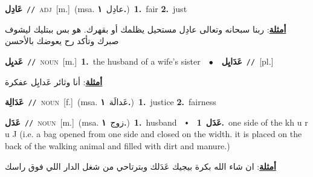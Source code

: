 \documentclass[10pt,a4paper,twoside]{article} %
\begin{document}
\begin{multicols}{2}
{\setlength\topsep{0pt}\textbf{\foreignlanguage{arabic}{عَادِل}}\ {\color{gray}\texttt{//}\color{black}}\ \textsc{adj}\ [m.]\ \color{gray}(msa. \foreignlanguage{arabic}{عادِل}~\foreignlanguage{arabic}{\textbf{١.}})\color{black}\ \textbf{1.}~fair  \textbf{2.}~just\  \begin{flushright}\color{gray}\foreignlanguage{arabic}{\textbf{\underline{\foreignlanguage{arabic}{أمثلة}}}: ربنا سبحانه وتعالى عادِل مستحيل يظلمك أو بقهرك. هو بس ببتليك ليشوف صبرك وتأكد رح يعوضك بالأحسن}\end{flushright}\color{black}} \vspace{2mm}

{\setlength\topsep{0pt}\textbf{\foreignlanguage{arabic}{عَديِل}}\ {\color{gray}\texttt{//}\color{black}}\ \textsc{noun}\ [m.]\ \textbf{1.}~the husband of a wife's sister\ \ $\bullet$\ \ \setlength\topsep{0pt}\textbf{\foreignlanguage{arabic}{عَدَايِل}}\ {\color{gray}\texttt{//}\color{black}}\ [pl.]\  \begin{flushright}\color{gray}\foreignlanguage{arabic}{\textbf{\underline{\foreignlanguage{arabic}{أمثلة}}}: أنا وثائر عَدايِل عفكرة}\end{flushright}\color{black}} \vspace{2mm}

{\setlength\topsep{0pt}\textbf{\foreignlanguage{arabic}{عَدَالِة}}\ {\color{gray}\texttt{//}\color{black}}\ \textsc{noun}\ [f.]\ \color{gray}(msa. \foreignlanguage{arabic}{عَدالَة}~\foreignlanguage{arabic}{\textbf{١.}})\color{black}\ \textbf{1.}~justice  \textbf{2.}~fairness\ } \vspace{2mm}

{\setlength\topsep{0pt}\textbf{\foreignlanguage{arabic}{عَدَل}}\ {\color{gray}\texttt{//}\color{black}}\ \textsc{noun}\ [m.]\ \color{gray}(msa. \foreignlanguage{arabic}{زوج}~\foreignlanguage{arabic}{\textbf{١.}})\color{black}\ \textbf{1.}~husband\ \ $\smblkdiamond$\ \ \setlength\topsep{0pt}\textbf{\foreignlanguage{arabic}{عَدَل}}\ \textbf{1.}~one side of the kh u r u J (i.e. a bag opened from one side and closed on the width. it is placed on the back of the walking animal and filled with dirt and manure.)\  \begin{flushright}\color{gray}\foreignlanguage{arabic}{\textbf{\underline{\foreignlanguage{arabic}{أمثلة}}}: ان شاء الله بكرة بيجيك عَدَلك وبترتاحي من شغل الدار اللي فوق راسك}\end{flushright}\color{black}} \vspace{2mm}


\end{multicols}
\end{document}
